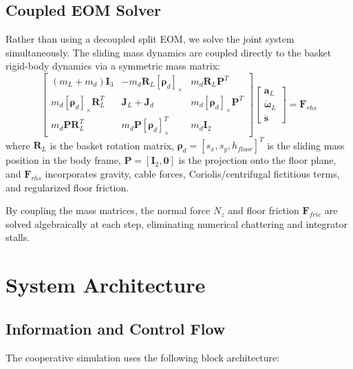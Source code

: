\documentclass[11pt,a4paper]{article}
\begin{document}
\subsection{Coupled EOM Solver}
Rather than using a decoupled split EOM, we solve the joint system simultaneously. The sliding mass dynamics are coupled directly to the basket rigid-body dynamics via a symmetric mass matrix:
\begin{equation}
    \begin{bmatrix}
        (m_L + m_d)\mathbf{I}_3 & -m_d \mathbf{R}_L [\boldsymbol{\rho}_d]_\times & m_d \mathbf{R}_L \mathbf{P}^T \\
        m_d [\boldsymbol{\rho}_d]_\times \mathbf{R}_L^T & \mathbf{J}_L + \mathbf{J}_d & m_d [\boldsymbol{\rho}_d]_\times \mathbf{P}^T \\
        m_d \mathbf{P} \mathbf{R}_L^T & m_d \mathbf{P} [\boldsymbol{\rho}_d]_\times^T & m_d \mathbf{I}_2
    \end{bmatrix}
    \begin{bmatrix}
        \mathbf{a}_L \\
        \boldsymbol{\dot{\omega}}_L \\
        \mathbf{\ddot{s}}
    \end{bmatrix} = \mathbf{F}_{rhs}
\end{equation}
where $\mathbf{R}_L$ is the basket rotation matrix, $\boldsymbol{\rho}_d = [s_x, s_y, h_{floor}]^T$ is the sliding mass position in the body frame, $\mathbf{P} = [\mathbf{I}_2, \mathbf{0}]$ is the projection onto the floor plane, and $\mathbf{F}_{rhs}$ incorporates gravity, cable forces, Coriolis/centrifugal fictitious terms, and regularized floor friction.

\begin{notebox}
    By coupling the mass matrices, the normal force $N_z$ and floor friction $\mathbf{F}_{fric}$ are solved algebraically at each step, eliminating numerical chattering and integrator stalls.
\end{notebox}

\newpage
\section{System Architecture}

\subsection{Information and Control Flow}
The cooperative simulation uses the following block architecture:
\end{document}
